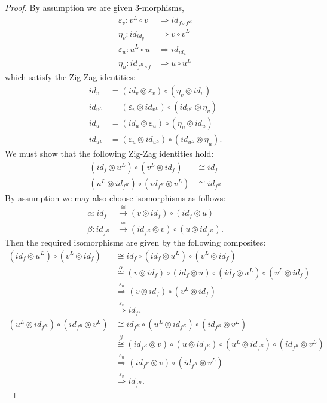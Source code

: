 \documentclass{amsart}
\begin{document}
\begin{proof}
By assumption we are given 3-morphisms,
\begin{align*}
	\varepsilon_v: v^L \circ v & \Rightarrow id_{f \circ f^R} \\
	\eta_v: id_{id_y} & \Rightarrow v \circ v^L \\
	\varepsilon_u: u^L \circ u & \Rightarrow id_{id_x} \\
	\eta_u: id_{f^R \circ f} & \Rightarrow  u \circ u^L
\end{align*}
which satisfy the Zig-Zag identities:
\begin{align*}
	 id_v  &= (id_v \circledcirc \varepsilon_v) \circ (\eta_v \circledcirc id_v)  \\
	 id_{v^L}  &= (\varepsilon_v \circledcirc id_{v^L} ) \circ (id_{v^L} \circledcirc \eta_v)  \\
	 id_u  &= (id_u \circledcirc \varepsilon_u) \circ (\eta_u \circledcirc id_u)  \\
	 id_{u^L}  &= (\varepsilon_u \circledcirc id_{u^L} ) \circ (id_{u^L} \circledcirc \eta_u).  
\end{align*}
We must show that the following Zig-Zag identities hold:
\begin{align*}
	 (id_{f} \circledcirc u^L) \circ (v^L \circledcirc id_{f} ) & \cong id_{f} \\
 	 (u^L \circledcirc id_{f^R}) \circ (id_{f^R} \circledcirc v^L) & \cong id_{f^R} 
\end{align*}
By assumption we may also choose isomorphisms as follows:
\begin{align*}
	\alpha: id_f &\stackrel{\cong}{\to} (v \circledcirc id_f) \circ (id_f \circledcirc u) \\
	\beta: id_{f^R} &\stackrel{\cong}{\to} (id_{f^R} \circledcirc v) \circ (u \circledcirc id_{f^R} ).
\end{align*}
Then the required isomorphisms are given by the following composites:
\begin{align*}
	(id_{f} \circledcirc u^L) \circ (v^L \circledcirc id_{f} )
		& \cong id_f \circ (id_{f} \circledcirc u^L) \circ (v^L \circledcirc id_{f} ) \\
		& \stackrel{\alpha}{\cong} (v \circledcirc id_f) \circ (id_f \circledcirc u) \circ (id_{f} \circledcirc u^L) \circ (v^L \circledcirc id_{f} ) \\
		&  \stackrel{\varepsilon_u }{\Rightarrow} (v \circledcirc id_f) \circ (v^L \circledcirc id_{f} ) \\
		& \stackrel{\varepsilon_v }{\Rightarrow} id_{f},  \\
	(u^L \circledcirc id_{f^R}) \circ (id_{f^R} \circledcirc v^L) 
		& \cong  id_{f^R} \circ (u^L \circledcirc id_{f^R}) \circ (id_{f^R} \circledcirc v^L)  \\
		& \stackrel{\beta}{\cong}  (id_{f^R} \circledcirc v) \circ (u \circledcirc id_{f^R} )  \circ (u^L \circledcirc id_{f^R}) \circ (id_{f^R} \circledcirc v^L) \\
		& \stackrel{\varepsilon_u }{\Rightarrow} (id_{f^R} \circledcirc v) \circ (id_{f^R} \circledcirc v^L) \\
		& \stackrel{\varepsilon_v }{\Rightarrow} id_{f^R}.
\end{align*}
\end{proof}
\end{document}
